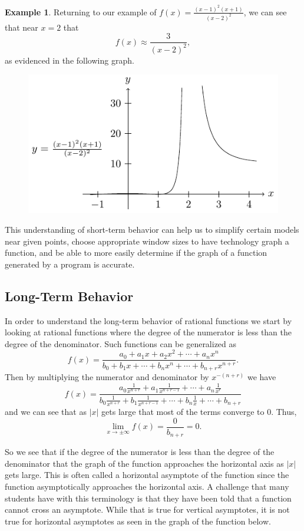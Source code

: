 \documentclass[
]{book}
\theoremstyle{definition}
\theoremstyle{definition}
\newtheorem{example}{Example}[chapter]
\theoremstyle{definition}
\theoremstyle{remark}
\begin{document}
\begin{example}
\protect\hypertarget{exm:unnamed-chunk-228}{}{\label{exm:unnamed-chunk-228} }Returning to our example of \(f(x)=\frac{(x-1)^2(x+1)}{(x-2)^2}\), we can see that near \(x=2\) that
\[f(x) \approx \frac{3}{(x-2)^2},\] as evidenced in the following graph.
\end{example}
\begin{figure}

{\centering \includegraphics[width=0.5\linewidth]{tikz/rational2} 

}

\end{figure}

This understanding of short-term behavior can help us to simplify certain models near given points, choose appropriate window sizes to have technology graph a function, and be able to more easily determine if the graph of a function generated by a program is accurate.

\hypertarget{long-term-behavior-1}{%
\subsection{Long-Term Behavior}\label{long-term-behavior-1}}

In order to understand the long-term behavior of rational functions we start by looking at rational functions where the degree of the numerator is less than the degree of the denominator. Such functions can be generalized as
\[f(x) = \frac{ a_0 + a_1 x + a_2 x^2 + \cdots + a_n x^n}{b_0 + b_1 x + \cdots + b_n x^n +\cdots +b_{n+r}x^{n+r}}.\]
Then by multiplying the numerator and denominator by \(x^{-(n+r)}\) we have
\[f(x) = \frac{ a_0\frac{1}{x^{n+r}} + a_1 \frac{1}{x^{n+r-1}} + \cdots + a_n \frac{1}{x^{r}}}{b_0 \frac{1}{x^{n+r}} + b_1 \frac{1}{x^{n+r-1}} + \cdots + b_n \frac{1}{x} +\cdots +b_{n+r}}\] and we can see that as \(|x|\) gets large that most of the terms converge to \(0\). Thus,
\[\lim_{x\rightarrow \pm \infty} f(x) = \frac{0}{b_{n+r}} = 0.\]

So we see that if the degree of the numerator is less than the degree of the denominator that the graph of the function approaches the horizontal axis as \(|x|\) gets large. This is often called a horizontal asymptote of the function since the function asymptotically approaches the horizontal axis. A challenge that many students have with this terminology is that they have been told that a function cannot cross an asymptote. While that is true for vertical asymptotes, it is not true for horizontal asymptotes as seen in the graph of the function below.
\end{document}

